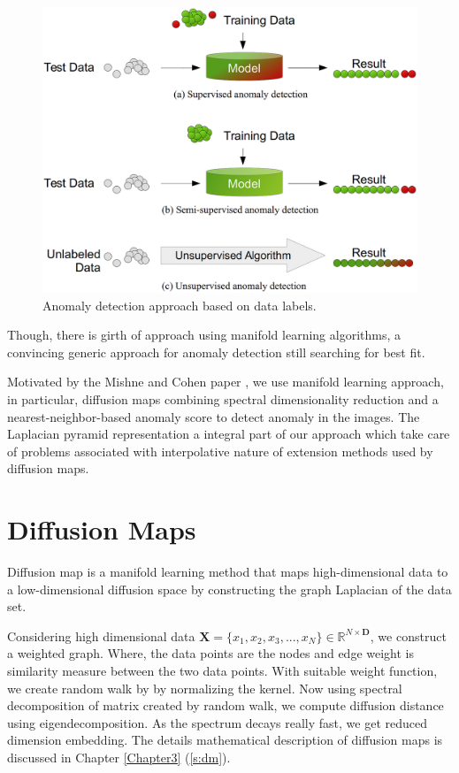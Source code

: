 \begin{figure}[ht]
\begin{center}
\includegraphics[width=\textwidth]{./Figures/anomaly.png}
\caption {Anomaly detection approach based on data labels.}
\label{anomaly}
\end{center}
\end{figure}

Though, there is girth of approach using manifold learning algorithms, a convincing generic approach for anomaly detection still searching for best fit. 

Motivated by the Mishne and Cohen paper \citep{Gal2013}, we use manifold learning approach, in particular, diffusion maps combining spectral dimensionality reduction and a nearest-neighbor-based anomaly score to detect anomaly in the images. The Laplacian pyramid representation a integral part of our approach which take care of problems associated with interpolative nature of extension methods used by diffusion maps.

\section{Diffusion Maps}
\label{dfm}
Diffusion map is a manifold learning method that maps high-dimensional data to a low-dimensional diffusion space by constructing the graph Laplacian of the data set.

Considering high dimensional data $\mathbf{X}=\{x_1, x_2, x_3, ..., x_N\}\in \mathbb{R}^{N\times\mathbf{D}}$, we construct a weighted graph. Where, the data points are the nodes and edge weight is similarity measure between the two data points. With suitable weight function, we create random walk by by normalizing the kernel. Now using spectral decomposition of matrix created by random walk, we compute diffusion distance using eigendecomposition. As the spectrum decays really fast, we get reduced dimension embedding. The details mathematical description of diffusion maps is discussed in Chapter \ref{Chapter3} (\ref{s:dm}).

